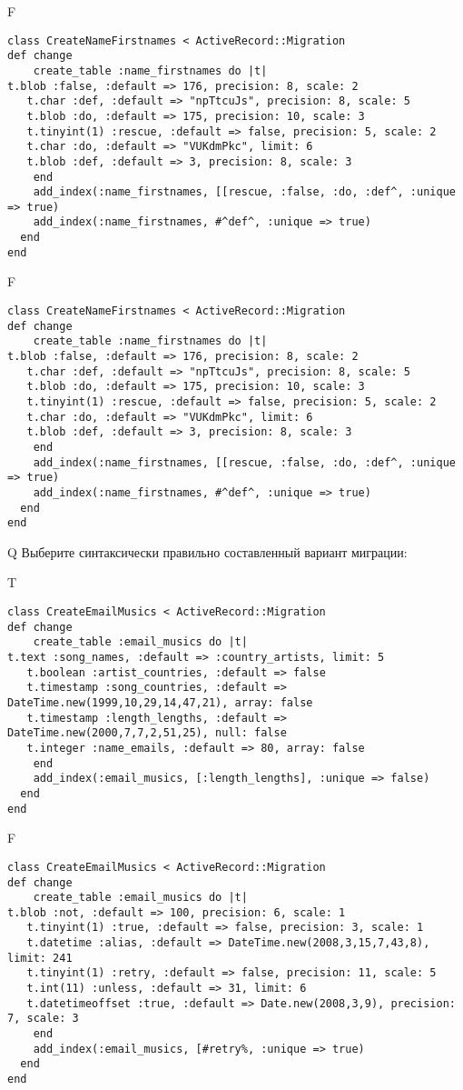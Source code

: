 F
\begin{verbatim}
class CreateNameFirstnames < ActiveRecord::Migration
def change
	create_table :name_firstnames do |t|
t.blob :false, :default => 176, precision: 8, scale: 2
   t.char :def, :default => "npTtcuJs", precision: 8, scale: 5
   t.blob :do, :default => 175, precision: 10, scale: 3
   t.tinyint(1) :rescue, :default => false, precision: 5, scale: 2
   t.char :do, :default => "VUKdmPkc", limit: 6
   t.blob :def, :default => 3, precision: 8, scale: 3
   	end
	add_index(:name_firstnames, [[rescue, :false, :do, :def^, :unique => true)
 	add_index(:name_firstnames, #^def^, :unique => true)
  end 
end

\end{verbatim}

F
\begin{verbatim}
class CreateNameFirstnames < ActiveRecord::Migration
def change
	create_table :name_firstnames do |t|
t.blob :false, :default => 176, precision: 8, scale: 2
   t.char :def, :default => "npTtcuJs", precision: 8, scale: 5
   t.blob :do, :default => 175, precision: 10, scale: 3
   t.tinyint(1) :rescue, :default => false, precision: 5, scale: 2
   t.char :do, :default => "VUKdmPkc", limit: 6
   t.blob :def, :default => 3, precision: 8, scale: 3
   	end
	add_index(:name_firstnames, [[rescue, :false, :do, :def^, :unique => true)
 	add_index(:name_firstnames, #^def^, :unique => true)
  end 
end

\end{verbatim}

Q
Выберите синтаксически правильно составленный вариант миграции:

T
\begin{verbatim}
class CreateEmailMusics < ActiveRecord::Migration
def change
	create_table :email_musics do |t|
t.text :song_names, :default => :country_artists, limit: 5
   t.boolean :artist_countries, :default => false
   t.timestamp :song_countries, :default => DateTime.new(1999,10,29,14,47,21), array: false
   t.timestamp :length_lengths, :default => DateTime.new(2000,7,7,2,51,25), null: false
   t.integer :name_emails, :default => 80, array: false
   	end
	add_index(:email_musics, [:length_lengths], :unique => false)
  end 
end

\end{verbatim}

F
\begin{verbatim}
class CreateEmailMusics < ActiveRecord::Migration
def change
	create_table :email_musics do |t|
t.blob :not, :default => 100, precision: 6, scale: 1
   t.tinyint(1) :true, :default => false, precision: 3, scale: 1
   t.datetime :alias, :default => DateTime.new(2008,3,15,7,43,8), limit: 241
   t.tinyint(1) :retry, :default => false, precision: 11, scale: 5
   t.int(11) :unless, :default => 31, limit: 6
   t.datetimeoffset :true, :default => Date.new(2008,3,9), precision: 7, scale: 3
   	end
	add_index(:email_musics, [#retry%, :unique => true)
  end 
end

\end{verbatim}


